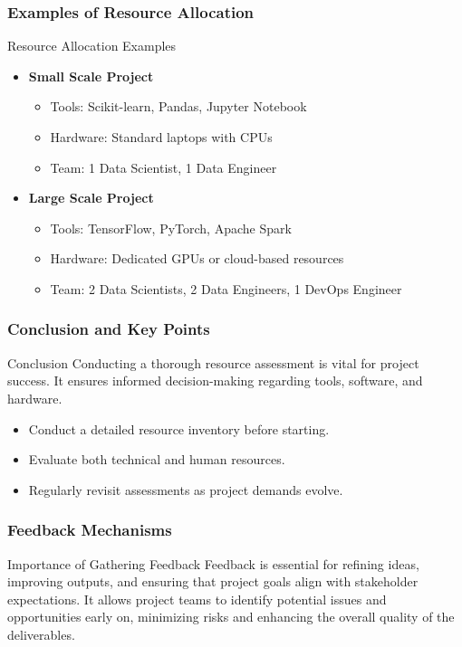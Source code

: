 \documentclass[aspectratio=169]{beamer}
\begin{document}
\begin{frame}[fragile]
    \frametitle{Examples of Resource Allocation}
    \begin{block}{Resource Allocation Examples}
        \begin{itemize}
            \item \textbf{Small Scale Project}
                \begin{itemize}
                    \item Tools: Scikit-learn, Pandas, Jupyter Notebook
                    \item Hardware: Standard laptops with CPUs
                    \item Team: 1 Data Scientist, 1 Data Engineer
                \end{itemize}
            \item \textbf{Large Scale Project}
                \begin{itemize}
                    \item Tools: TensorFlow, PyTorch, Apache Spark
                    \item Hardware: Dedicated GPUs or cloud-based resources
                    \item Team: 2 Data Scientists, 2 Data Engineers, 1 DevOps Engineer
                \end{itemize}
        \end{itemize}
    \end{block}
\end{frame}

\begin{frame}[fragile]
    \frametitle{Conclusion and Key Points}
    \begin{block}{Conclusion}
        Conducting a thorough resource assessment is vital for project success. It ensures informed decision-making regarding tools, software, and hardware.
    \end{block}

    \begin{itemize}
        \item Conduct a detailed resource inventory before starting.
        \item Evaluate both technical and human resources.
        \item Regularly revisit assessments as project demands evolve.
    \end{itemize}
\end{frame}

\begin{frame}[fragile]
    \frametitle{Feedback Mechanisms}
    \begin{block}{Importance of Gathering Feedback}
        Feedback is essential for refining ideas, improving outputs, and ensuring that project goals align with stakeholder expectations.
        It allows project teams to identify potential issues and opportunities early on, minimizing risks and enhancing the overall quality of the deliverables.
    \end{block}
\end{frame}
\end{document}
